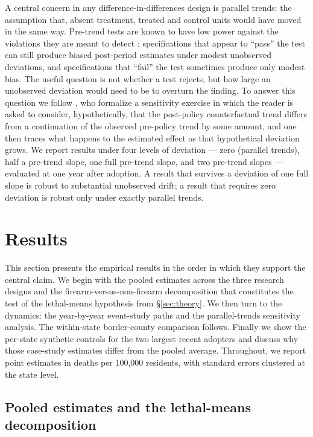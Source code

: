 \documentclass[12pt]{article}
\begin{document}
A central concern in any difference-in-differences design is
parallel trends: the assumption that, absent treatment, treated
and control units would have moved in the same way. Pre-trend
tests are known to have low power against the violations they are
meant to detect \citep{roth2022}: specifications that appear to
``pass'' the test can still produce biased post-period estimates
under modest unobserved deviations, and specifications that
``fail'' the test sometimes produce only modest bias. The useful
question is not whether a test rejects, but how large an
unobserved deviation would need to be to overturn the finding. To
answer this question we follow \citet{rambachan2023}, who
formalize a sensitivity exercise in which the reader is asked to
consider, hypothetically, that the post-policy counterfactual
trend differs from a continuation of the observed pre-policy
trend by some amount, and one then traces what happens to the
estimated effect as that hypothetical deviation grows. We report
results under four levels of deviation --- zero (parallel trends),
half a pre-trend slope, one full pre-trend slope, and two pre-trend
slopes --- evaluated at one year after adoption. A result that
survives a deviation of one full slope is robust to substantial
unobserved drift; a result that requires zero deviation is robust
only under exactly parallel trends.

\section{Results}\label{sec:results}

This section presents the empirical results in the order in which
they support the central claim. We begin with the pooled estimates
across the three research designs and the firearm-versus-non-firearm
decomposition that constitutes the test of the lethal-means
hypothesis from §\ref{sec:theory}. We then turn to the dynamics:
the year-by-year event-study paths and the parallel-trends
sensitivity analysis. The within-state border-county comparison
follows. Finally we show the per-state synthetic controls for the
two largest recent adopters and discuss why those case-study
estimates differ from the pooled average. Throughout, we report
point estimates in deaths per 100,000 residents, with standard
errors clustered at the state level.

\subsection{Pooled estimates and the lethal-means decomposition}\label{sec:headline}
\end{document}
